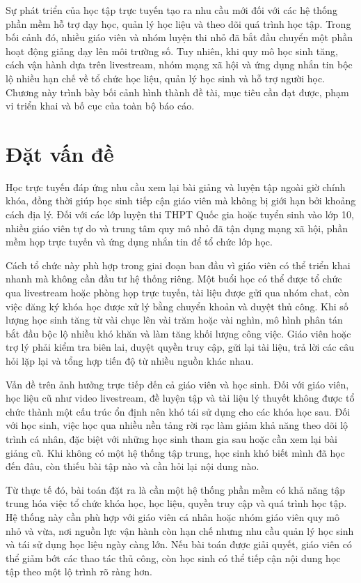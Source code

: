 \documentclass[../DoAn.tex]{subfiles}
\begin{document}
\setcounter{chapter}{1}

Sự phát triển của học tập trực tuyến tạo ra nhu cầu mới đối với các hệ thống phần mềm hỗ trợ dạy học, quản lý học liệu và theo dõi quá trình học tập. Trong bối cảnh đó, nhiều giáo viên và nhóm luyện thi nhỏ đã bắt đầu chuyển một phần hoạt động giảng dạy lên môi trường số. Tuy nhiên, khi quy mô học sinh tăng, cách vận hành dựa trên livestream, nhóm mạng xã hội và ứng dụng nhắn tin bộc lộ nhiều hạn chế về tổ chức học liệu, quản lý học sinh và hỗ trợ người học. Chương này trình bày bối cảnh hình thành đề tài, mục tiêu cần đạt được, phạm vi triển khai và bố cục của toàn bộ báo cáo.

\section{Đặt vấn đề}
\label{section:1.1}

Học trực tuyến đáp ứng nhu cầu xem lại bài giảng và luyện tập ngoài giờ chính khóa, đồng thời giúp học sinh tiếp cận giáo viên mà không bị giới hạn bởi khoảng cách địa lý. Đối với các lớp luyện thi THPT Quốc gia hoặc tuyển sinh vào lớp 10, nhiều giáo viên tự do và trung tâm quy mô nhỏ đã tận dụng mạng xã hội, phần mềm họp trực tuyến và ứng dụng nhắn tin để tổ chức lớp học.

Cách tổ chức này phù hợp trong giai đoạn ban đầu vì giáo viên có thể triển khai nhanh mà không cần đầu tư hệ thống riêng. Một buổi học có thể được tổ chức qua livestream hoặc phòng họp trực tuyến, tài liệu được gửi qua nhóm chat, còn việc đăng ký khóa học được xử lý bằng chuyển khoản và duyệt thủ công. Khi số lượng học sinh tăng từ vài chục lên vài trăm hoặc vài nghìn, mô hình phân tán bắt đầu bộc lộ nhiều khó khăn và làm tăng khối lượng công việc. Giáo viên hoặc trợ lý phải kiểm tra biên lai, duyệt quyền truy cập, gửi lại tài liệu, trả lời các câu hỏi lặp lại và tổng hợp tiến độ từ nhiều nguồn khác nhau.

Vấn đề trên ảnh hưởng trực tiếp đến cả giáo viên và học sinh. Đối với giáo viên, học liệu cũ như video livestream, đề luyện tập và tài liệu lý thuyết không được tổ chức thành một cấu trúc ổn định nên khó tái sử dụng cho các khóa học sau. Đối với học sinh, việc học qua nhiều nền tảng rời rạc làm giảm khả năng theo dõi lộ trình cá nhân, đặc biệt với những học sinh tham gia sau hoặc cần xem lại bài giảng cũ. Khi không có một hệ thống tập trung, học sinh khó biết mình đã học đến đâu, còn thiếu bài tập nào và cần hỏi lại nội dung nào.

Từ thực tế đó, bài toán đặt ra là cần một hệ thống phần mềm có khả năng tập trung hóa việc tổ chức khóa học, học liệu, quyền truy cập và quá trình học tập. Hệ thống này cần phù hợp với giáo viên cá nhân hoặc nhóm giáo viên quy mô nhỏ và vừa, nơi nguồn lực vận hành còn hạn chế nhưng nhu cầu quản lý học sinh và tái sử dụng học liệu ngày càng lớn. Nếu bài toán được giải quyết, giáo viên có thể giảm bớt các thao tác thủ công, còn học sinh có thể tiếp cận nội dung học tập theo một lộ trình rõ ràng hơn.
\end{document}
